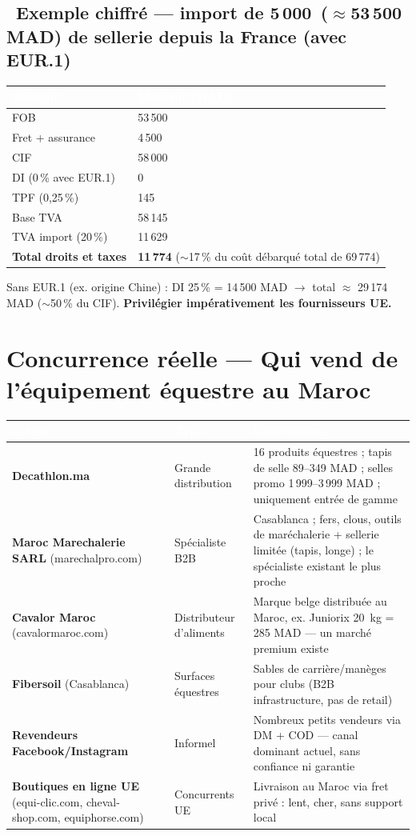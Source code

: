 \documentclass[11pt,a4paper]{article}
\newcommand{\thead}[1]{\textcolor{white}{\textbf{#1}}}
\begin{document}
\subsection{\faEuroSign\ Exemple chiffré --- import de 5\,000\,\texteuro{} ($\approx$53\,500 MAD) de sellerie depuis la France (avec EUR.1)}
{\small
\noindent
\begin{tabular}{L{9.5cm} L{5cm}}
\toprule
{}
\thead{Élément} & \thead{Montant (MAD)}\\
\midrule
FOB & 53\,500\\
Fret + assurance & 4\,500\\
CIF & 58\,000\\
DI (0\,\% avec EUR.1) & 0\\
TPF (0,25\,\%) & 145\\
Base TVA & 58\,145\\
TVA import (20\,\%) & 11\,629\\
\midrule
\textbf{Total droits et taxes} & \textbf{11\,774} ($\sim$17\,\% du coût débarqué total de 69\,774)\\
\bottomrule
\end{tabular}}

Sans EUR.1 (ex. origine Chine) : DI 25\,\% = 14\,500 MAD $\rightarrow$ total $\approx$ 29\,174 MAD ($\sim$50\,\% du CIF). \textbf{Privilégier impérativement les fournisseurs UE.}

\section{Concurrence réelle --- Qui vend de l'équipement équestre au Maroc}

{\small
\noindent
\begin{tabular}{L{4.0cm} L{2.5cm} L{9.0cm}}
\toprule
{}
\thead{Acteur} & \thead{Type} & \thead{Observations}\\
\midrule
\textbf{Decathlon.ma} & Grande distribution & 16 produits équestres ; tapis de selle 89--349 MAD ; selles promo 1\,999--3\,999 MAD ; uniquement entrée de gamme\\
\textbf{Maroc Marechalerie SARL} (marechalpro.com) & Spécialiste B2B & Casablanca ; fers, clous, outils de maréchalerie + sellerie limitée (tapis, longe) ; le spécialiste existant le plus proche\\
\textbf{Cavalor Maroc} (cavalormaroc.com) & Distributeur d'aliments & Marque belge distribuée au Maroc, ex. Juniorix 20~kg = 285 MAD --- un marché premium existe\\
\textbf{Fibersoil} (Casablanca) & Surfaces équestres & Sables de carrière/manèges pour clubs (B2B infrastructure, pas de retail)\\
\textbf{Revendeurs Facebook/Instagram} & Informel & Nombreux petits vendeurs via DM + COD --- canal dominant actuel, sans confiance ni garantie\\
\textbf{Boutiques en ligne UE} (equi-clic.com, cheval-shop.com, equiphorse.com) & Concurrents UE & Livraison au Maroc via fret privé : lent, cher, sans support local\\
\bottomrule
\end{tabular}}
\end{document}
